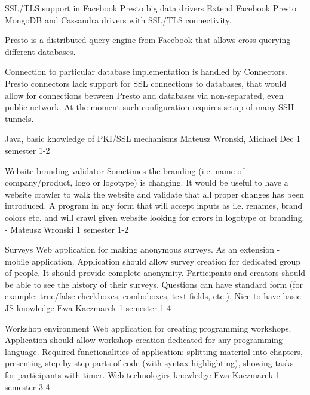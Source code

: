 \begin{project}
{SSL/TLS support in Facebook Presto big data drivers}
{Extend Facebook Presto MongoDB and Cassandra drivers with SSL/TLS connectivity.} 
{
Presto is a distributed-query engine from Facebook that allows cross-querying different databases.

Connection to particular database implementation is handled by Connectors. Presto connectors lack support for SSL connections to databases, that would allow for connections between Presto and databases via non-separated, even public network. At the moment such configuration requires setup of many SSH tunnels.
}
{Java, basic knowledge of PKI/SSL mechanisms}
{Mateusz Wronski, Michael Dec}
{1 semester}
{1-2}
\end{project}
\begin{project}
{Website branding validator}
{Sometimes the branding (i.e. name of company/product, logo or logotype) is changing. It would be useful to have a website crawler to walk the website and validate that all proper changes has been introduced.} 
{
A program in any form that will accept inputs as i.e. renames, brand colors etc. and will crawl given website looking for errors in logotype or branding.
}
{-}
{Mateusz Wronski}
{1 semester}
{1-2}
\end{project}
\begin{project}
{Surveys}
{Web application for making anonymous surveys. As an extension - mobile application.} 
{
Application should allow survey creation for dedicated group of people. It should provide complete anonymity. Participants and creators should be able to see the history of their surveys. Questions can have standard form (for example: true/false checkboxes, comboboxes, text fields, etc.).
}
{Nice to have basic JS knowledge}
{Ewa Kaczmarek}
{1 semester}
{1-4}
\end{project}
\begin{project}
{Workshop environment}
{Web application for creating programming workshops.} 
{
Application should allow workshop creation dedicated for any programming language. Required functionalities of application: splitting material into chapters, presenting step by step parts of code (with syntax highlighting), showing tasks for participants with timer.
}
{Web technologies knowledge}
{Ewa Kaczmarek}
{1 semester}
{3-4}
\end{project}
